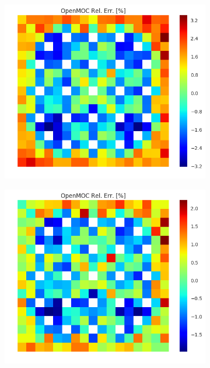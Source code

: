 \begin{figure}[h!]
\centering
\begin{subfigure}{.33\textwidth}
  \centering
  \includegraphics[width=\linewidth]{figures/quantification/assm-16/infinite-capt-err-2}
  \caption{}
  \label{fig:chap8-assm-1.6-inf-capt-2}
\end{subfigure}%
\begin{subfigure}{.33\textwidth}
  \centering
  \includegraphics[width=\linewidth]{figures/quantification/assm-16/infinite-capt-err-8}

\end{subfigure}
\end{figure}
